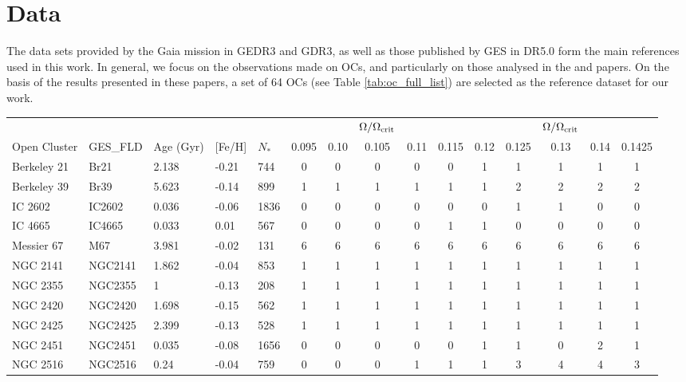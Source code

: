 \documentclass[fleqn,usenatbib]{mnras}
\begin{document}
\section{Data} \label{sec_method}
The data sets provided by the Gaia mission in GEDR3 and GDR3, as well as those published by GES in DR5.0 form the main references used in this work. In general, we focus on the observations made on OCs, and particularly on those analysed in the \cite{Bragaglia2022} and \cite{Randich2022} papers. On the basis of the results presented in these papers, a set of 64 OCs (see Table \ref{tab:oc_full_list}) are selected as the reference dataset for our work. 

\begin{table}
	\centering
	\begin{tabular}{|l l l l l || c c c c c | c c c c c|} 
		\hline
             & & & & & & & $\Omega / \Omega_{\mathrm{crit}}$ & & & & & $\Omega / \Omega_{\mathrm{crit}}$ & & \\
		Open Cluster & GES\_FLD & Age (Gyr) & [Fe/H] & $N_*$ & 0.095 & 0.10 & 0.105 & 0.11 & 0.115 & 0.12 & 0.125 & 0.13 & 0.14 & 0.1425\\
		\hline
            Berkeley 21 & Br21 & 2.138 & -0.21 & 744 & 0 & 0 & 0 & 0 & 0 & 1 & 1 & 1 & 1 & 1\\
            Berkeley 39 & Br39 & 5.623 & -0.14 & 899 & 1 & 1 & 1 & 1 & 1 & 1 & 2 & 2 & 2 & 2\\
            IC 2602 & IC2602 & 0.036 & -0.06 & 1836 & 0 & 0 & 0 & 0 & 0 & 0 & 1 & 1 & 0 & 0\\
            IC 4665 & IC4665 & 0.033 & 0.01 & 567 & 0 & 0 & 0 & 0 & 1 & 1 & 0 & 0 & 0 & 0\\
            Messier 67 & M67 & 3.981 & -0.02 & 131 & 6 & 6 & 6 & 6 & 6 & 6 & 6 & 6 & 6 & 6\\
            NGC 2141 & NGC2141 & 1.862 & -0.04 & 853 & 1 & 1 & 1 & 1 & 1 & 1 & 1 & 1 & 1 & 1\\
            NGC 2355 & NGC2355 & 1 & -0.13 & 208 & 1 & 1 & 1 & 1 & 1 & 1 & 1 & 1 & 1 & 1\\
            NGC 2420 & NGC2420 & 1.698 & -0.15 & 562 & 1 & 1 & 1 & 1 & 1 & 1 & 1 & 1 & 1 & 1\\
            NGC 2425 & NGC2425 & 2.399 & -0.13 & 528 & 1 & 1 & 1 & 1 & 1 & 1 & 1 & 1 & 1 & 1\\
            NGC 2451 & NGC2451 & 0.035 & -0.08 & 1656 & 0 & 0 & 0 & 0 & 0 & 1 & 1 & 0 & 2 & 1\\
            NGC 2516 & NGC2516 & 0.24 & -0.04 & 759 & 0 & 0 & 0 & 1 & 1 & 1 & 3 & 4 & 4 & 3\\

\end{tabular}
\end{table}
\end{document}
